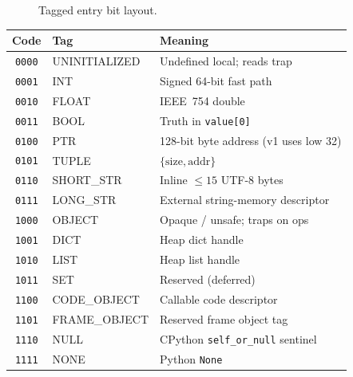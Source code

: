 \documentclass[11pt,a4paper]{article}
\newcommand{\bitfield}[1]{\texttt{#1}}
\begin{document}
\begin{figure}[htbp]
\centering
{}
\caption{Tagged entry bit layout.}
\label{fig:tagbits}
\end{figure}

\begin{center}
\begin{tabular}{@{}clp{7.8cm}@{}}
\toprule
\textbf{Code} & \textbf{Tag} & \textbf{Meaning} \\
\midrule
\texttt{0000} & UNINITIALIZED & Undefined local; reads trap \\
\texttt{0001} & INT & Signed 64-bit fast path \\
\texttt{0010} & FLOAT & IEEE~754 double \\
\texttt{0011} & BOOL & Truth in \bitfield{value[0]} \\
\texttt{0100} & PTR & 128-bit byte address (v1 uses low 32) \\
\texttt{0101} & TUPLE & $\{\mathrm{size},\mathrm{addr}\}$ \\
\texttt{0110} & SHORT\_STR & Inline $\le 15$ UTF-8 bytes \\
\texttt{0111} & LONG\_STR & External string-memory descriptor \\
\texttt{1000} & OBJECT & Opaque / unsafe; traps on ops \\
\texttt{1001} & DICT & Heap dict handle \\
\texttt{1010} & LIST & Heap list handle \\
\texttt{1011} & SET & Reserved (deferred) \\
\texttt{1100} & CODE\_OBJECT & Callable code descriptor \\
\texttt{1101} & FRAME\_OBJECT & Reserved frame object tag \\
\texttt{1110} & NULL & CPython \texttt{self\_or\_null} sentinel \\
\texttt{1111} & NONE & Python \texttt{None} \\
\bottomrule
\end{tabular}
\end{center}
\end{document}
